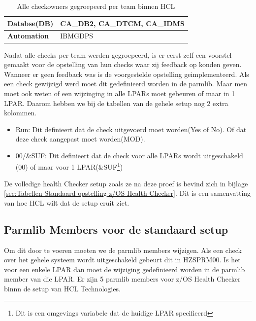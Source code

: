 \begin{table}[h]
\begin{tabular}{|l|p{9cm}|}
		\textbf{Databse(DB)}               & CA\_DB2, CA\_DTCM, CA\_IDMS                                                                                                                                            \\ \hline
		\textbf{Automation}                & IBMGDPS                                                                                                                                                                \\ \hline
	\end{tabular}
	\caption[Checks Per team]{Alle checkowners gegroepeerd per team binnen HCL}
	\label{tbl:Checks Per Team}
\end{table}

Nadat alle checks per team werden gegroepeerd, is er eerst zelf een voorstel gemaakt voor de opstelling van hun checks waar zij feedback op konden geven. Wanneer er geen feedback was is de voorgestelde opstelling geimplementeerd. Als een check gewijzigd werd moet dit gedefinieerd worden in de parmlib. Maar men moet ook weten of een wijzinging in alle LPARs moet gebeuren of maar in 1 LPAR. Daarom hebben we bij de tabellen van de gehele setup nog 2 extra kolommen.

\begin{itemize}
	\item Run: Dit definieert dat de check uitgevoerd moet worden(Yes of No). Of dat deze check aangepast moet worden(MOD).
	\item 00/\&SUF: Dit definieert dat de check voor alle LPARs wordt uitgeschakeld (00) of maar voor 1 LPAR(\&SUF\footnote{Dit is een omgevings variabele dat de huidige LPAR specifieerd})
\end{itemize}

De volledige health Checker setup zoals ze na deze proef is bevind zich in bijlage \ref{sec:Tabellen Standaard opstelling z/OS Health Checker}. Dit is een samenvatting van hoe HCL wilt dat de setup eruit ziet. 

\subsection{Parmlib Members voor de standaard setup}
\label{subsec:Parmlib Members voor de standaard setup}

Om dit door te voeren moeten we de parmlib members wijzigen. Als een check over het gehele systeem wordt uitgeschakeld gebeurt dit in HZSPRM00. Is het voor een enkele LPAR dan moet de wijziging gedefinieerd worden in de parmlib member van die LPAR. Er zijn 5 parmlib members voor z/OS Health Checker binnn de setup van HCL Technologies.


